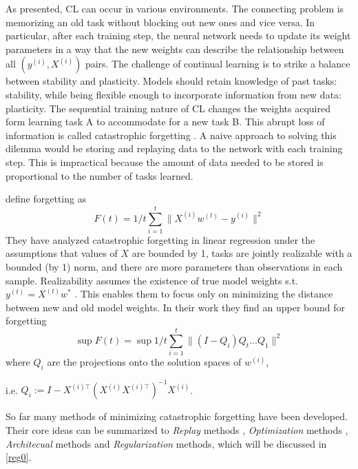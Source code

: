 As presented, CL can occur in various environments. The connecting problem is memorizing an old task without blocking out new ones and vice versa. In particular, after each training step, the neural network needs to update its weight parameters in a way that the new weights can describe the relationship between all $(y^{(i)}, X^{(i)})$ pairs.
The challenge of continual learning is to strike a balance between stability and plasticity. Models should retain knowledge of past tasks: stability, while being flexible enough to incorporate information from new data: plasticity. The sequential training nature of CL changes the weights acquired form learning task A to accommodate for a new task B. This abrupt loss of information is called catastrophic forgetting \cite{FRENCH1999128, Mcclelland1995, MCCLOSKEY1989109, Ratcliff1990ConnectionistMO}. A naive approach to solving this dilemma would be storing and replaying data to the network with each training step. This is impractical because the amount of data needed to be stored is proportional to the number of tasks learned.

\citeauthor{evron2022} \cite{evron2022} define forgetting as
\begin{equation}
	F(t) = 1/t \sum_{i=1}^{t}\lVert X^{(i)} w^{(t)} - y^{(i)} \rVert^2
\end{equation}
They have analyzed catastrophic forgetting in linear regression under the assumptions that values of $X$ are bounded by 1, tasks are jointly realizable with a bounded (by 1) norm, and there are more parameters than observations in each sample. Realizability assumes the existence of true model weights s.t. $y^{(t)}=X^{(t)}w^*$ \cite{Shalev-Shwartz}. This enables them to focus only on minimizing the distance between new and old model weights. In their work they find an upper bound for forgetting
\begin{equation}
	\sup F(t) = \sup 1/t \sum_{i=1}^{t}\lVert(I-Q_i)Q_t ... Q_1\rVert^2
\end{equation}
where $Q_i$ are the projections onto the solution spaces of $w^{(i)}$, 

i.e. $Q_i := I - X^{(i)\top}(X^{(i)} X^{(i)\top})^{-1} X^{(i)}$.

So far many methods of minimizing catastrophic forgetting have been developed. Their core ideas can be summarized to \textit{Replay} methods \cite{chaudhry2019,rebuffi2017icarlincrementalclassifierrepresentation, aljundi2019gradientbasedsampleselection}, \textit{Optimization} methods \cite{lopezpaz2022gradientepisodicmemorycontinual, javed2019metalearningrepresentationscontinuallearning, mirzadeh2020understandingroletrainingregimes}, \textit{Architecual} methods \cite{mallya2018piggybackadaptingsinglenetwork, ebrahimi2020adversarialcontinuallearning, fernando2017pathnetevolutionchannelsgradient} and \textit{Regularization} methods, which will be discussed in \autoref{reg0}.

